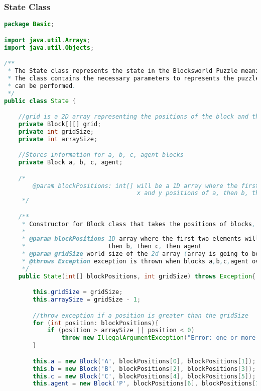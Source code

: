 \documentclass[a4paper, 11pt]{article} %
\begin{document}
\subsubsection{State Class}
\begin{lstlisting}[language=java]
package Basic;

import java.util.Arrays;
import java.util.Objects;

/**
 * The State class represents the state in the Blocksworld Puzzle meaning that it holds the positions of all the blocks a,b,c as well as the agent.
 * The class contains the necessary parameters to represents the puzzle grid as well as methods that allow the agent to move or check whether a mvoe
 * can be performed.
 */
public class State {

    //grid is a 2D array representing the positions of the block and the agent
    private Block[][] grid;
    private int gridSize;
    private int arraySize;

    //Stores information for a, b, c, agent blocks
    private Block a, b, c, agent;

    /*
        @param blockPositions: int[] will be a 1D array where the first two elements will be the
                                     x and y positions of a, then b, then c, then agent
     */

    /**
     * Constructor for Block class that takes the positions of blocks, gridSize and throws an Exception
     *
     * @param blockPositions 1D array where the first two elements will be the x and y positions of a,
     *                       then b, then c, then agent
     * @param gridSize world size of the 2d array (array is going to be of size gridSize * gridSize)
     * @throws Exception exception is thrown when blocks a,b,c,agent overlap (IllegalArgumentException)
     */
    public State(int[] blockPositions, int gridSize) throws Exception{

        this.gridSize = gridSize;
        this.arraySize = gridSize - 1;

        //throw exception if a position is greater than the gridSize
        for (int position: blockPositions){
            if (position > arraySize || position < 0)
                throw new IllegalArgumentException("Error: one or more of the parameters you entered is not within the range 0 and " + arraySize + "." );
        }

        this.a = new Block('A', blockPositions[0], blockPositions[1]);
        this.b = new Block('B', blockPositions[2], blockPositions[3]);
        this.c = new Block('C', blockPositions[4], blockPositions[5]);
        this.agent = new Block('P', blockPositions[6], blockPositions[7]);


\end{lstlisting}
\end{document}
